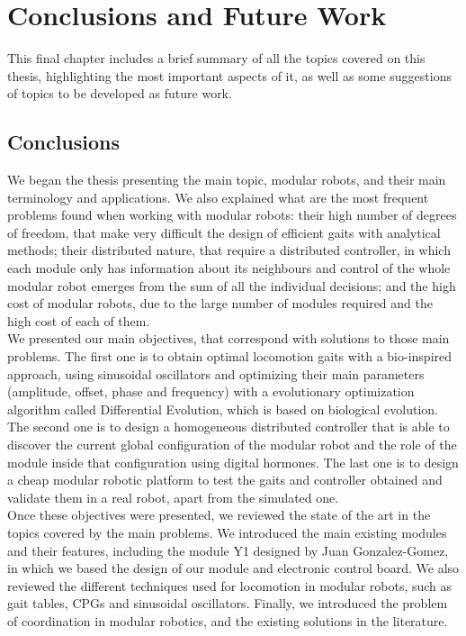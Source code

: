 \chapter{Conclusions and Future Work}
\label{conclusions_future_work}

This final chapter includes a brief summary of all the topics covered on this thesis, highlighting the most important aspects of it, as well as some suggestions of topics to be developed as future work.\\

\section{Conclusions}
\label{conclusions}



We began the thesis presenting the main topic, modular robots, and their main terminology and applications. We also explained what are the most frequent problems found when working with modular robots: their high number of degrees of freedom, that make very difficult the design of efficient gaits with analytical methods; their distributed nature, that require a distributed controller, in which each module only has information about its neighbours and control of the whole modular robot emerges from the sum of all the individual decisions; and the high cost of modular robots, due to the large number of modules required and the  high cost of each of them.\\

We presented our main objectives, that correspond with solutions to those main problems. The first one is to obtain optimal locomotion gaits with a bio-inspired approach, using sinusoidal oscillators and optimizing their main parameters (amplitude, offset, phase and frequency) with a evolutionary optimization algorithm called Differential Evolution, which is based on biological evolution. The second one is to design a homogeneous distributed controller that is able to discover the current global configuration of the modular robot and the role of the module inside that configuration using digital hormones. The last one is to design a cheap modular robotic platform to test the gaits and controller obtained and validate them in a real robot, apart from the simulated one.\\

Once these objectives were presented, we reviewed the state of the art in the topics covered by the main problems. We introduced the main existing modules and their features, including the module Y1 designed by Juan Gonzalez-Gomez, in which we based the design of our module and electronic control board. We also reviewed the different techniques used for locomotion in modular robots, such as gait tables, CPGs and sinusoidal oscillators. Finally, we introduced the problem of coordination in modular robotics, and the existing solutions in the literature.\\

